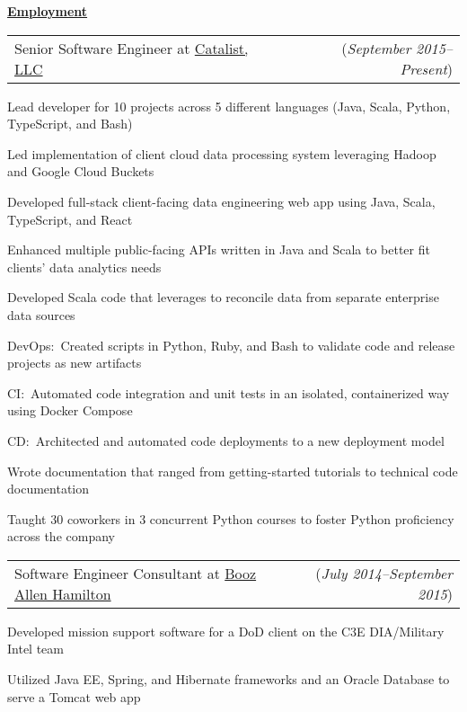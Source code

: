 \documentclass[11pt, letterpaper]{letter}
\makeatletter
\newlength{\indwidth}            \setlength{\indwidth}{\textwidth-.4in}
\newlength{\headerAntispace}     \setlength{\headerAntispace}{-6pt}
\newcommand{\dated}[2]{
    \begin{tabular*}{\indwidth}{l@{\extracolsep{\fill}}r}
        #1 & (\textit{#2})
    \end{tabular*}
}
\newcommand{\myul}[3]{
    \begingroup
        \renewcommand{\ULdepth}{#1}
        \renewcommand{\ULthickness}{#2}
        \uline{#3}
    \endgroup
}
\newcommand{\sectionheader}[1]{
    \myul{2.7pt}{0.5pt}{\large \textbf{#1}}
}
\newcommand{\CatalistLLC}{\href{https://catalist.us/}{Catalist, LLC}}
\newcommand{\BAH}{\href{https://www.boozallen.com/}{Booz Allen Hamilton}}
\makeatother
\begin{document}
\sectionheader{Employment}
\vspace{\headerAntispace}
\begin{compactitem}
    \item \dated{Senior Software Engineer at \CatalistLLC}{September 2015--Present}
        \begin{compactitem}
            \item Lead developer for 10 projects across 5 different languages (Java, Scala, Python, TypeScript, and
                Bash)
            \item Led implementation of client cloud data processing system leveraging Hadoop and Google Cloud Buckets
            \item Developed full-stack client-facing data engineering web app using Java, Scala, TypeScript, and React
            \item Enhanced multiple public-facing APIs written in Java and Scala to better fit clients' data analytics
                needs
            \item Developed Scala code that leverages \Elasticsearch{} to reconcile data from separate enterprise data
                sources
            \item DevOps:\ Created scripts in Python, Ruby, and Bash to validate code and release projects as new
                artifacts
            \item CI:\ Automated code integration and unit tests in an isolated, containerized way using Docker Compose
            \item CD:\ Architected and automated code deployments to a new \BlueGreen{} deployment model
            \item Wrote documentation that ranged from getting-started tutorials to technical code documentation
            \item Taught 30 coworkers in 3 concurrent Python courses to foster Python proficiency across the company
        \end{compactitem}
    \item \dated{Software Engineer Consultant at \BAH}{July 2014--September 2015}
        \begin{compactitem}
            \item Developed mission support software for a DoD client on the C3E DIA/Military Intel team
            \item Utilized Java EE, Spring, and Hibernate frameworks and an Oracle Database to serve a Tomcat web app

\end{compactitem}
\end{compactitem}
\end{document}
